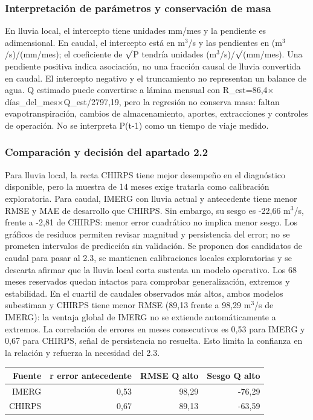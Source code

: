 \subsubsection*{Interpretación de parámetros y conservación de masa}
En lluvia local, el intercepto tiene unidades mm/mes y la pendiente es adimensional. En caudal, el intercepto está en m$^3$/s y las pendientes en (m$^3$/s)/(mm/mes); el coeficiente de $\sqrt{\vphantom{P}}$P tendría unidades (m$^3$/s)/$\sqrt{\vphantom{P}}$(mm/mes). Una pendiente positiva indica asociación, no una fracción causal de lluvia convertida en caudal. El intercepto negativo y el truncamiento no representan un balance de agua. Q estimado puede convertirse a lámina mensual con R\_est=86,4$\times$días\_del\_mes$\times$Q\_est/2797,19, pero la regresión no conserva masa: faltan evapotranspiración, cambios de almacenamiento, aportes, extracciones y controles de operación. No se interpreta P(t-1) como un tiempo de viaje medido.
\subsubsection*{Comparación y decisión del apartado 2.2}
Para lluvia local, la recta CHIRPS tiene mejor desempeño en el diagnóstico disponible, pero la muestra de 14 meses exige tratarla como calibración exploratoria. Para caudal, IMERG con lluvia actual y antecedente tiene menor RMSE y MAE de desarrollo que CHIRPS. Sin embargo, su sesgo es -22,66 m$^3$/s, frente a -2,81 de CHIRPS: menor error cuadrático no implica menor sesgo. Los gráficos de residuos permiten revisar magnitud y persistencia del error; no se prometen intervalos de predicción sin validación. Se proponen dos candidatos de caudal para pasar al 2.3, se mantienen calibraciones locales exploratorias y se descarta afirmar que la lluvia local corta sustenta un modelo operativo. Los 68 meses reservados quedan intactos para comprobar generalización, extremos y estabilidad. En el cuartil de caudales observados más altos, ambos modelos subestiman y CHIRPS tiene menor RMSE (89,13 frente a 98,29 m$^3$/s de IMERG): la ventaja global de IMERG no se extiende automáticamente a extremos. La correlación de errores en meses consecutivos es 0,53 para IMERG y 0,67 para CHIRPS, señal de persistencia no resuelta. Esto limita la confianza en la relación y refuerza la necesidad del 2.3.
\begin{center}\small\begin{tabular}{rrrr}\hline
Fuente & r error antecedente & RMSE Q alto & Sesgo Q alto \\ \hline
IMERG & 0,53 & 98,29 & -76,29 \\
CHIRPS & 0,67 & 89,13 & -63,59 \\
\hline\end{tabular}\end{center}
